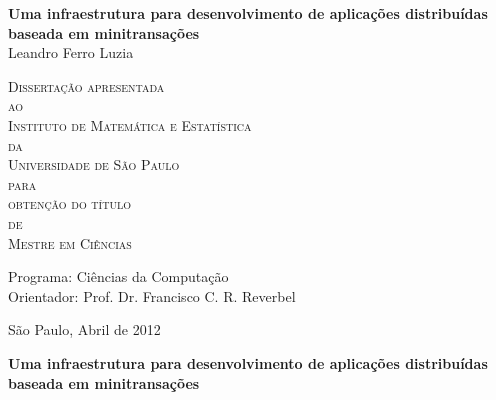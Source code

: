 \documentclass[11pt,twoside,a4paper]{book}
\begin{document}
\frontmatter 
\fancyhead[RO]{{\footnotesize\rightmark}\hspace{2em}\thepage}
\setcounter{tocdepth}{2}
\fancyhead[LE]{\thepage\hspace{2em}\footnotesize{\leftmark}}
\fancyhead[RE,LO]{}
\fancyhead[RO]{{\footnotesize\rightmark}\hspace{2em}\thepage}

\onehalfspacing

\thispagestyle{empty}
\begin{center}
    \vspace*{2.3cm}
    \textbf{\Large{Uma infraestrutura para desenvolvimento de aplicações distribuídas baseada em minitransações}}\\
    
    \vspace*{1.2cm}
    \Large{Leandro Ferro Luzia}
    
    \vskip 2cm
    \textsc{
    Dissertação apresentada\\[-0.25cm] 
    ao\\[-0.25cm]
    Instituto de Matemática e Estatística\\[-0.25cm]
    da\\[-0.25cm]
    Universidade de São Paulo\\[-0.25cm]
    para\\[-0.25cm]
    obtenção do título\\[-0.25cm]
    de\\[-0.25cm]
    Mestre em Ciências}
    
    \vskip 1.5cm
    Programa: Ciências da Computação\\
    Orientador: Prof. Dr. Francisco C. R. Reverbel
    \vskip 1cm
    
    \vskip 0.5cm
    \normalsize{São Paulo, Abril de 2012}
\end{center}

\newpage
\thispagestyle{empty}
    \begin{center}
        \vspace*{2.3 cm}
        \textbf{\Large{Uma infraestrutura para desenvolvimento de aplicações distribuídas baseada em minitransações}}\\
        \vspace*{2 cm}
    \end{center}
\end{document}

